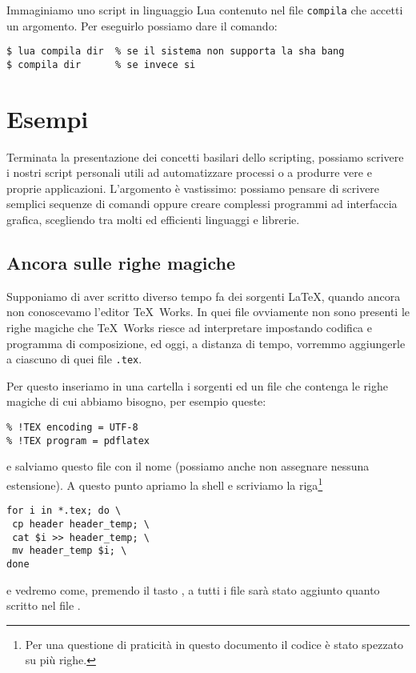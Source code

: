 Immaginiamo uno script in linguaggio Lua contenuto nel file \texttt{compila}
che accetti un argomento. Per eseguirlo possiamo dare il comando:
\begin{Verbatim}
$ lua compila dir  % se il sistema non supporta la sha bang
$ compila dir      % se invece si
\end{Verbatim}

\section{Esempi}

Terminata la presentazione dei concetti basilari dello scripting, possiamo
scrivere i nostri script personali utili ad automatizzare processi o a produrre
vere e proprie applicazioni. L'argomento è vastissimo: possiamo pensare di
scrivere semplici sequenze di comandi oppure creare complessi programmi ad
interfaccia grafica, scegliendo tra molti ed efficienti linguaggi e librerie.

\subsection{Ancora sulle righe magiche}
\label{sssec:addheader}

Supponiamo di aver scritto diverso tempo fa dei sorgenti \LaTeX, quando ancora
non conoscevamo l'editor TeX~Works. In quei file ovviamente non sono presenti le
righe magiche che TeX~Works riesce ad interpretare impostando codifica e
programma di composizione, ed oggi, a distanza di tempo, vorremmo aggiungerle a
ciascuno di quei file \texttt{.tex}.

Per questo inseriamo in una cartella i sorgenti ed un file che contenga le
righe magiche di cui abbiamo bisogno, per esempio queste:
\begin{Verbatim}
% !TEX encoding = UTF-8
% !TEX program = pdflatex
\end{Verbatim}
e salviamo questo file con il nome  (possiamo anche non
assegnare nessuna estensione). A questo punto apriamo la shell e scriviamo la
riga\footnote{Per una questione di praticità in questo documento il codice è
stato spezzato su più righe.}
\begin{Verbatim}
for i in *.tex; do \
 cp header header_temp; \
 cat $i >> header_temp; \
 mv header_temp $i; \
done
\end{Verbatim}
e vedremo come, premendo il tasto \keys{\return}, a tutti i file sarà stato
aggiunto quanto scritto nel file .

